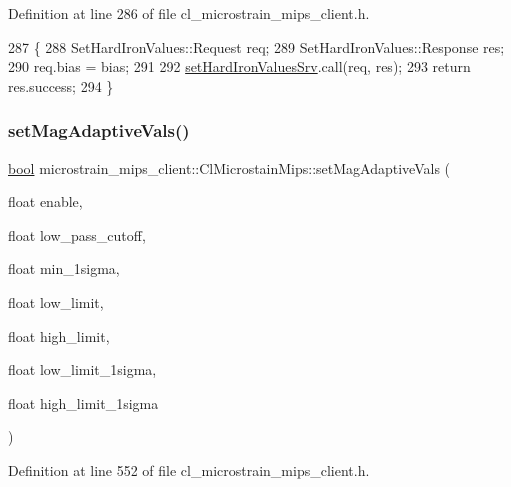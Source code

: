 Definition at line 286 of file cl\+\_\+microstrain\+\_\+mips\+\_\+client.\+h.


\begin{DoxyCode}
287     \{
288         SetHardIronValues::Request req;
289         SetHardIronValues::Response res;
290         req.bias = bias;
291 
292         \hyperlink{classmicrostrain__mips__client_1_1ClMicrostainMips_a998f8ed1540e2170aeaf8b47b6cb6e5e}{setHardIronValuesSrv}.call(req, res);
293         \textcolor{keywordflow}{return} res.success;
294     \}
\end{DoxyCode}
\mbox{\label{classmicrostrain__mips__client_1_1ClMicrostainMips_abca0864a38d13f7162a481b4d80f207c}} 
\subsubsection{\texorpdfstring{set\+Mag\+Adaptive\+Vals()}{setMagAdaptiveVals()}}
{\footnotesize\ttfamily \hyperlink{classbool}{bool} microstrain\+\_\+mips\+\_\+client\+::\+Cl\+Microstain\+Mips\+::set\+Mag\+Adaptive\+Vals (\begin{DoxyParamCaption}\item[{float}]{enable,  }\item[{float}]{low\+\_\+pass\+\_\+cutoff,  }\item[{float}]{min\+\_\+1sigma,  }\item[{float}]{low\+\_\+limit,  }\item[{float}]{high\+\_\+limit,  }\item[{float}]{low\+\_\+limit\+\_\+1sigma,  }\item[{float}]{high\+\_\+limit\+\_\+1sigma }\end{DoxyParamCaption})\hspace{0.3cm}{\ttfamily [inline]}}



Definition at line 552 of file cl\+\_\+microstrain\+\_\+mips\+\_\+client.\+h.



